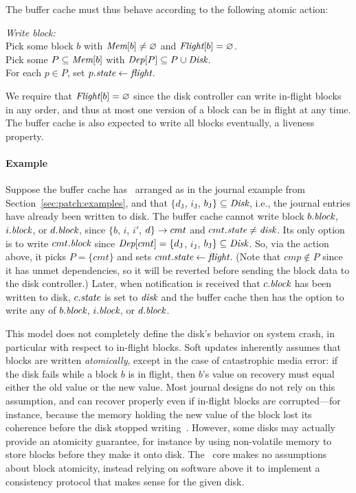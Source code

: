 The buffer cache must thus behave according to the following atomic action:

\begin{tabbing}
\textit{Write block:} \\
\quad Pick some block $b$ with $\PMem[b] \neq \emptyset$ and $\PInf[b] =
\emptyset$. \\
\quad Pick some $P \subseteq \PMem[b]$ with $\PDepset{P} \subseteq P \cup
\PDisk$. \\
\quad For each $p \in P$, set $p.\textit{state} \gets \textit{flight}$.
\end{tabbing}

\noindent
%
We require that $\PInf[b] = \emptyset$ since the disk controller can write
in-flight blocks in any order, and thus at most one version of a block can
be in flight at any time.
%
The buffer cache is also expected to write all blocks eventually, a
 liveness property.

\paragraph{Example}
%
Suppose the buffer cache has \patches\ arranged as in the journal example from
Section~\ref{sec:patch:examples}, and that $\{d_\textrm{J}$, $i_\textrm{J}$,
$b_\textrm{J}\} \subseteq \PDisk$, i.e., the journal entries have already been
written to disk.
%
The buffer cache cannot write block $b.\textit{block}$, $i.\textit{block}$, or $d.\textit{block}$,
since $\{b$, $i$, $i'$, $d\} \rightarrow cmt$ and $cmt.\textit{state} \neq \textit{disk}$.
%
Its only option is to write $cmt.\textit{block}$ since $\textit{Dep}[cmt] =
\{d_\textrm{J}$, $i_\textrm{J}$, $b_\textrm{J}\} \subseteq \PDisk$.
%
So, via the action above, it picks $P = \{cmt\}$ and sets $cmt.\textit{state} \gets
\textit{flight}$. (Note that $cmp \not \in P$ since it has unmet dependencies, so it
will be reverted before sending the block data to the disk controller.)
%
Later, when notification is received that $c.\textit{block}$ has been written to disk,
$c.\textit{state}$ is set to $\textit{disk}$ and the buffer cache then has the option to
write any of $b.\textit{block}$, $i.\textit{block}$, or $d.\textit{block}$.

This model does not completely define the disk's behavior on system crash,
 in particular with respect to in-flight blocks.
%
Soft updates inherently assumes that blocks are written
\emph{atomically}, except in the case of catastrophic media error:
%
if the disk fails while a block $b$ is in flight, then $b$'s
value on recovery must equal either the old value or the new value.
%
Most journal designs do not rely on this assumption, and can recover
 properly even if in-flight blocks are corrupted---for instance,
 because the memory holding the new value of the block lost its coherence
 before the disk stopped writing~\cite{nightingale06rethink}.
%
However, some disks may actually provide an atomicity guarantee, for
 instance by using non-volatile memory to store blocks before they make it
 onto disk.
%
The \Kudos\ core makes no assumptions about block atomicity, instead relying
 on software above it to implement a consistency protocol that makes sense
 for the given disk.


